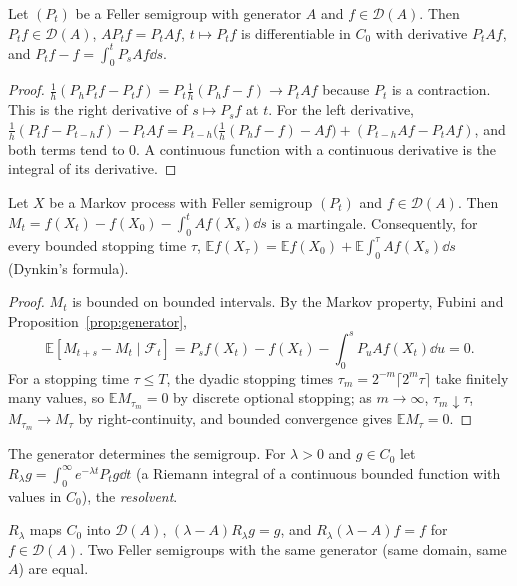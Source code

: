 \begin{proposition}\label{prop:generator}
Let $(P_t)$ be a Feller semigroup with generator $A$ and $f\in\mathcal D(A)$. Then $P_tf\in\mathcal D(A)$, $AP_tf=P_tAf$, $t\mapsto P_tf$ is differentiable in $C_0$ with derivative $P_tAf$, and
$P_tf-f=\int_0^tP_sAf\dd s$.
\end{proposition}

\begin{proof}
$\frac1h(P_hP_tf-P_tf)=P_t\frac1h(P_hf-f)\to P_tAf$ because $P_t$ is a contraction. This is the right derivative of $s\mapsto P_sf$ at $t$. For the left derivative, $\frac1h(P_tf-P_{t-h}f)-P_tAf=P_{t-h}\bigl(\frac1h(P_hf-f)-Af\bigr)+(P_{t-h}Af-P_tAf)$, and both terms tend to $0$. A continuous function with a continuous derivative is the
integral of its derivative.
\end{proof}

\begin{theorem}\label{thm:dynkin}
Let $X$ be a Markov process with Feller semigroup $(P_t)$ and $f\in\mathcal D(A)$. Then $M_t=f(X_t)-f(X_0)-\int_0^tAf(X_s)\dd s$ is a martingale. Consequently, for every bounded stopping time $\tau$,
$\mathbb Ef(X_\tau)=\mathbb Ef(X_0)+\mathbb E\int_0^\tau Af(X_s)\dd s$ (Dynkin's formula).
\end{theorem}

\begin{proof}
$M_t$ is bounded on bounded intervals. By the Markov property, Fubini and Proposition~\ref{prop:generator},
\[
\mathbb E[M_{t+s}-M_t\mid\mathcal F_t]=P_sf(X_t)-f(X_t)-\int_0^sP_uAf(X_t)\dd u=0 .
\]
For a stopping time $\tau\le T$, the dyadic stopping times $\tau_m=2^{-m}\lceil2^m\tau\rceil$ take finitely many values, so $\mathbb EM_{\tau_m}=0$ by discrete optional stopping; as $m\to\infty$, $\tau_m\downarrow\tau$, $M_{\tau_m}\to M_\tau$ by
right-continuity, and bounded convergence gives $\mathbb EM_\tau=0$.
\end{proof}

The generator determines the semigroup. For $\lambda>0$ and $g\in C_0$ let $R_\lambda g=\int_0^\infty e^{-\lambda t}P_tg\dd t$ (a Riemann integral of a continuous bounded function with values in $C_0$), the \emph{resolvent}.

\begin{proposition}\label{prop:resolvent}
$R_\lambda$ maps $C_0$ into $\mathcal D(A)$, $(\lambda-A)R_\lambda g=g$, and $R_\lambda(\lambda-A)f=f$ for $f\in\mathcal D(A)$. Two Feller semigroups with the same generator (same domain, same $A$) are equal.
\end{proposition}

